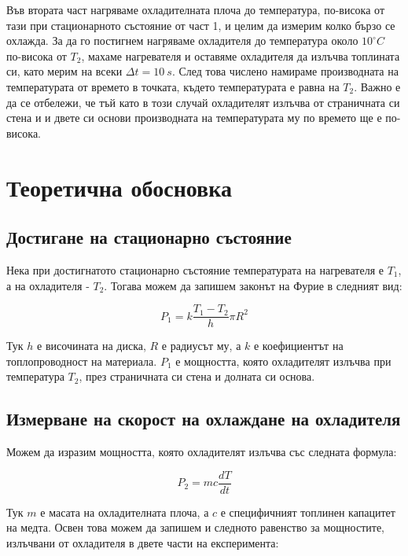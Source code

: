 \documentclass[reprint,amsmath,amssymb,aps,floatfix]{revtex4-2}
\newcommand{\degree}{^{\circ}}
\begin{document}
Във втората част нагряваме охладителната плоча до температура, по-висока от тази при стационарното състояние от част 1, и целим да измерим колко бързо се охлажда. За да го постигнем нагряваме охладителя до температура около $10 \degree C$ по-висока от $T_2$, махаме нагревателя и оставяме охладителя да излъчва топлината си, като мерим на всеки $\Delta t = 10 \ \si{s}$. След това числено намираме производната на температурата от времето в точката, където температурата е равна на $T_2$. Важно е да се отбележи, че тъй като в този случай охладителят излъчва от страничната си стена и и двете си основи производната на температурата му по времето ще е по-висока. 


\section{Теоретична обосновка}
\subsection{Достигане на стационарно състояние}

Нека при достигнатото стационарно състояние температурата на нагревателя е $T_1$, а на охладителя - $T_2$. Тогава можем да запишем законът на Фурие в следният вид:

\begin{equation*} \label{eq:1}
    P_1 = k\frac{T_1 - T_2}{h} \pi R^2 \tag{1}
\end{equation*}

Тук $h$ е височината на диска, $R$ е радиусът му, а $k$ е коефициентът на топлопроводност на материала. $P_1$ е мощността, която охладителят излъчва при температура $T_2$, през страничната си стена и долната си основа.

\subsection{Измерване на скорост на охлаждане на охладителя}

Можем да изразим мощността, която охладителят излъчва със следната формула: 

\begin{equation*} \label{eq:2}
    P_2 = m c \frac{dT}{dt} \tag{2}
\end{equation*}

Тук $m$ е масата на охладителната плоча, а $c$ е специфичният топлинен капацитет на медта. Освен това можем да запишем и следното равенство за мощностите, излъчвани от охладителя в двете части на експеримента: 
\end{document}
